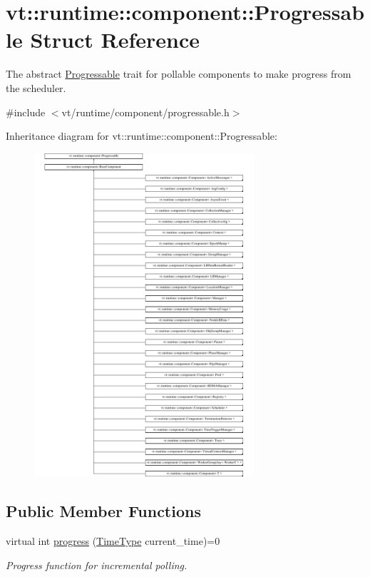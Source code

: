 \hypertarget{structvt_1_1runtime_1_1component_1_1_progressable}{}\section{vt\+:\+:runtime\+:\+:component\+:\+:Progressable Struct Reference}
\label{structvt_1_1runtime_1_1component_1_1_progressable}


The abstract {\ttfamily \hyperlink{structvt_1_1runtime_1_1component_1_1_progressable}{Progressable}} trait for pollable components to make progress from the scheduler.  




{\ttfamily \#include $<$vt/runtime/component/progressable.\+h$>$}

Inheritance diagram for vt\+:\+:runtime\+:\+:component\+:\+:Progressable\+:\begin{figure}[H]
\begin{center}
\leavevmode
\includegraphics[height=12.000000cm]{structvt_1_1runtime_1_1component_1_1_progressable}
\end{center}
\end{figure}
\subsection*{Public Member Functions}
\begin{DoxyCompactItemize}
\item 
virtual int \hyperlink{structvt_1_1runtime_1_1component_1_1_progressable_a75f1e623643f2273835fdf047d3d0cd3}{progress} (\hyperlink{namespacevt_a876a9d0cd5a952859c72de8a46881442}{Time\+Type} current\+\_\+time)=0
\begin{DoxyCompactList}\small\item\em Progress function for incremental polling. \end{DoxyCompactList}\end{DoxyCompactItemize}


